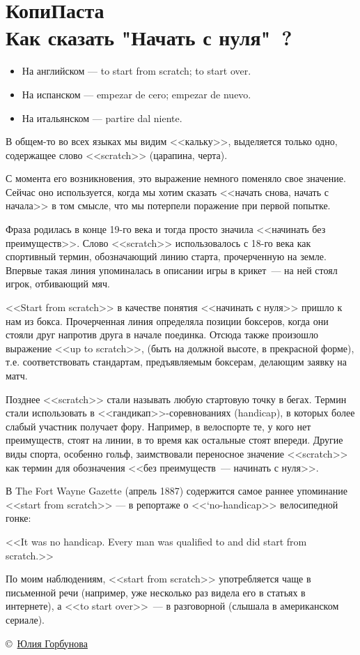 \documentclass{magazine}
\begin{document}
\section{КопиПаста\\Как сказать "Начать с нуля"\ ?}
\begin{multicols}{2}

\begin{itemize}
  \item
На английском — to start from scratch; to start over.
  \item
На испанском — empezar de cero; empezar de nuevo.
  \item
На итальянском — partire dal niente.
\end{itemize}

В общем-то во всех языках мы видим <<кальку>>, выделяется только одно,
содержащее слово <<scratch>> (царапина, черта).

С момента его возникновения, это выражение немного поменяло свое значение.
Сейчас оно используется, когда мы хотим сказать <<начать снова, начать с
начала>> в том смысле, что мы потерпели поражение при первой попытке.

Фраза родилась в конце 19-го века и тогда просто значила <<начинать без
преимуществ>>. Слово <<scratch>> использовалось с 18-го века как спортивный
термин, обозначающий линию старта, прочерченную на земле. Впервые такая линия
упоминалась в описании игры в крикет\ --- на ней стоял игрок, отбивающий мяч.

<<Start from scratch>> в качестве понятия <<начинать с нуля>> пришло к нам из
бокса. Прочерченная линия определяла позиции боксеров, когда они стояли друг
напротив друга в начале поединка. Отсюда также произошло выражение <<up to
scratch>>, (быть на должной высоте, в прекрасной форме), т.е. соответствовать
стандартам, предъявляемым боксерам, делающим заявку на матч.

Позднее <<scratch>> стали называть любую стартовую точку в бегах. Термин стали
использовать в <<гандикап>>-соревнованиях (handicap), в которых более слабый
участник получает фору. Например, в велоспорте те, у кого нет преимуществ, стоят
на линии, в то время как остальные стоят впереди. Другие виды спорта, особенно
гольф, заимствовали переносное значение <<scratch>> как термин для обозначения
<<без преимуществ\ --- начинать с нуля>>.

В The Fort Wayne Gazette (апрель 1887) содержится самое раннее упоминание <<start
from scratch>> — в репортаже о <<‘no-handicap>> велосипедной гонке:

<<It was no handicap. Every man was qualified to and did start from scratch.>>

По моим наблюдениям, <<start from scratch>> употребляется чаще в письменной речи
(например, уже несколько раз видела его в статьях в интернете), а <<to start
over>>\ --- в разговорной (слышала в американском сериале).

\bigskip
\copyright\ \href{http://www.lingvaroom.ru/kak-skazat-nachat-s-nulya/}{Юлия
Горбунова}

\end{multicols}
\end{document}
